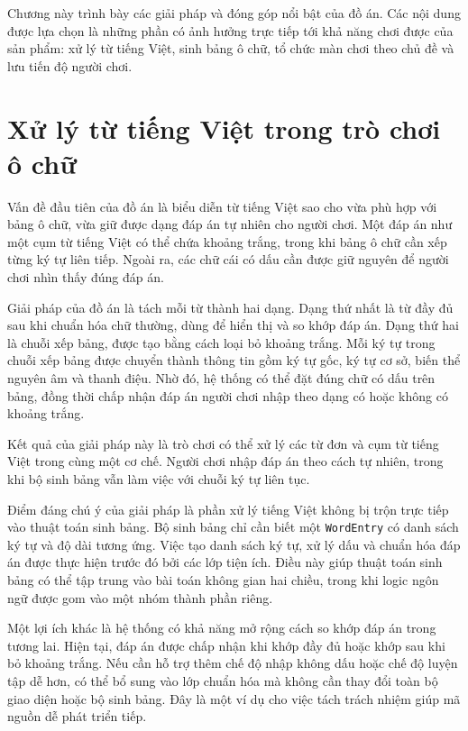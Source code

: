 \documentclass[../DoAn.tex]{subfiles}
\begin{document}
Chương này trình bày các giải pháp và đóng góp nổi bật của đồ án. Các nội dung được lựa chọn là những phần có ảnh hưởng trực tiếp tới khả năng chơi được của sản phẩm: xử lý từ tiếng Việt, sinh bảng ô chữ, tổ chức màn chơi theo chủ đề và lưu tiến độ người chơi.

\section{Xử lý từ tiếng Việt trong trò chơi ô chữ}
Vấn đề đầu tiên của đồ án là biểu diễn từ tiếng Việt sao cho vừa phù hợp với bảng ô chữ, vừa giữ được dạng đáp án tự nhiên cho người chơi. Một đáp án như một cụm từ tiếng Việt có thể chứa khoảng trắng, trong khi bảng ô chữ cần xếp từng ký tự liên tiếp. Ngoài ra, các chữ cái có dấu cần được giữ nguyên để người chơi nhìn thấy đúng đáp án.

Giải pháp của đồ án là tách mỗi từ thành hai dạng. Dạng thứ nhất là từ đầy đủ sau khi chuẩn hóa chữ thường, dùng để hiển thị và so khớp đáp án. Dạng thứ hai là chuỗi xếp bảng, được tạo bằng cách loại bỏ khoảng trắng. Mỗi ký tự trong chuỗi xếp bảng được chuyển thành thông tin gồm ký tự gốc, ký tự cơ sở, biến thể nguyên âm và thanh điệu. Nhờ đó, hệ thống có thể đặt đúng chữ có dấu trên bảng, đồng thời chấp nhận đáp án người chơi nhập theo dạng có hoặc không có khoảng trắng.

Kết quả của giải pháp này là trò chơi có thể xử lý các từ đơn và cụm từ tiếng Việt trong cùng một cơ chế. Người chơi nhập đáp án theo cách tự nhiên, trong khi bộ sinh bảng vẫn làm việc với chuỗi ký tự liên tục.

Điểm đáng chú ý của giải pháp là phần xử lý tiếng Việt không bị trộn trực tiếp vào thuật toán sinh bảng. Bộ sinh bảng chỉ cần biết một \texttt{WordEntry} có danh sách ký tự và độ dài tương ứng. Việc tạo danh sách ký tự, xử lý dấu và chuẩn hóa đáp án được thực hiện trước đó bởi các lớp tiện ích. Điều này giúp thuật toán sinh bảng có thể tập trung vào bài toán không gian hai chiều, trong khi logic ngôn ngữ được gom vào một nhóm thành phần riêng.

Một lợi ích khác là hệ thống có khả năng mở rộng cách so khớp đáp án trong tương lai. Hiện tại, đáp án được chấp nhận khi khớp đầy đủ hoặc khớp sau khi bỏ khoảng trắng. Nếu cần hỗ trợ thêm chế độ nhập không dấu hoặc chế độ luyện tập dễ hơn, có thể bổ sung vào lớp chuẩn hóa mà không cần thay đổi toàn bộ giao diện hoặc bộ sinh bảng. Đây là một ví dụ cho việc tách trách nhiệm giúp mã nguồn dễ phát triển tiếp.
\end{document}
